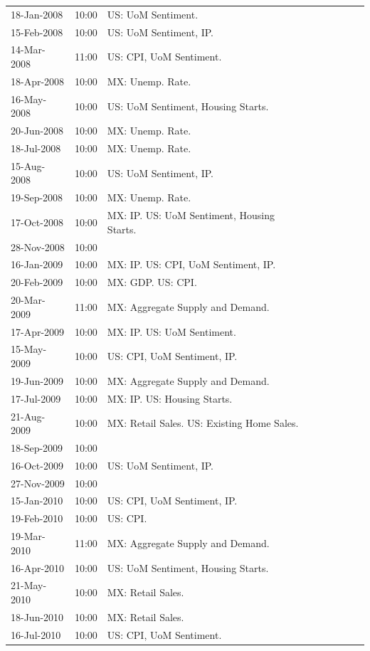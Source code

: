 \documentclass[a4paper,12pt]{article} 		%
\begin{document}
\begin{tiny}
\begin{center}
\begin{longtable}{p{1.8cm}p{1cm}p{11.7cm}p{1.8cm}p{1cm}p{11.7cm}p{1.8cm}p{1cm}p{11.7cm}}
			18-Jan-2008 & 10:00 & US: UoM Sentiment. \\
			15-Feb-2008 & 10:00 & US: UoM Sentiment, IP. \\
			14-Mar-2008 & 11:00 & US: CPI, UoM Sentiment. \\
			18-Apr-2008 & 10:00 & MX: Unemp. Rate. \\
			16-May-2008 & 10:00 & US: UoM Sentiment, Housing Starts. \\
			20-Jun-2008 & 10:00 & MX: Unemp. Rate. \\
			18-Jul-2008 & 10:00 & MX: Unemp. Rate. \\
			15-Aug-2008 & 10:00 & US: UoM Sentiment, IP. \\
			19-Sep-2008 & 10:00 & MX: Unemp. Rate. \\
			17-Oct-2008 & 10:00 & MX: IP. US: UoM Sentiment, Housing Starts. \\
			28-Nov-2008 & 10:00 &  \\
			16-Jan-2009 & 10:00 & MX: IP. US: CPI, UoM Sentiment, IP. \\
			20-Feb-2009 & 10:00 & MX: GDP. US: CPI. \\
			20-Mar-2009 & 11:00 & MX: Aggregate Supply and Demand. \\
			17-Apr-2009 & 10:00 & MX: IP. US: UoM Sentiment. \\
			15-May-2009 & 10:00 & US: CPI, UoM Sentiment, IP. \\
			19-Jun-2009 & 10:00 & MX: Aggregate Supply and Demand. \\
			17-Jul-2009 & 10:00 & MX: IP. US: Housing Starts. \\
			21-Aug-2009 & 10:00 & MX: Retail Sales. US: Existing Home Sales. \\
			18-Sep-2009 & 10:00 &  \\
			16-Oct-2009 & 10:00 & US: UoM Sentiment, IP. \\
			27-Nov-2009 & 10:00 &  \\
			15-Jan-2010 & 10:00 & US: CPI, UoM Sentiment, IP. \\
			19-Feb-2010 & 10:00 & US: CPI. \\
			19-Mar-2010 & 11:00 & MX: Aggregate Supply and Demand. \\
			16-Apr-2010 & 10:00 & US: UoM Sentiment, Housing Starts. \\
			21-May-2010 & 10:00 & MX: Retail Sales. \\
			18-Jun-2010 & 10:00 & MX: Retail Sales. \\
			16-Jul-2010 & 10:00 & US: CPI, UoM Sentiment. \\

\end{longtable}
\end{center}
\end{tiny}
\end{document}
